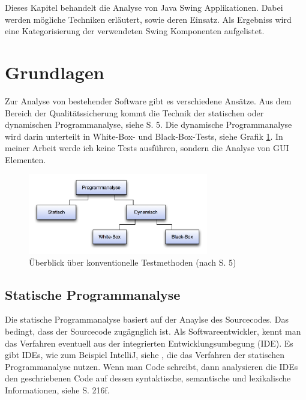   Dieses Kapitel behandelt die Analyse von Java Swing Applikationen. Dabei
  werden mögliche Techniken erläutert, sowie deren Einsatz. Als Ergebniss wird
  eine Kategorisierung der verwendeten Swing Komponenten aufgelistet.
  
  \section{Grundlagen}
  
  Zur Analyse von bestehender Software gibt es verschiedene Ansätze. Aus dem
  Bereich der Qualitätssicherung kommt die Technik der statischen oder
  dynamischen Programmanalyse, siehe \cite{SoftwareanalyseBegriffeUndTechniken}
  S. 5. Die dynamische Programmanalyse wird darin unterteilt in White-Box-
  und Black-Box-Tests, siehe Grafik \ref{img:programmanalyse}. In meiner Arbeit
  werde ich keine Tests ausführen, sondern die Analyse von \ac{GUI} Elementen.
  
  \begin{figure}[ht]
    \begin{center}
      \includegraphics[width=0.7\textwidth]{./image/programmanalyse.png}
      \caption{Überblick über konventionelle Testmethoden (nach
      \cite{SoftwareanalyseBegriffeUndTechniken} S. 5)}
      \label{img:programmanalyse}
    \end{center}
  \end{figure}
  
  \subsection{Statische Programmanalyse}

  Die statische Programmanalyse basiert auf der Anaylse des Sourcecodes. Das
  bedingt, dass der Sourcecode zugägnglich ist. Als Softwareentwickler, kennt
  man das Verfahren eventuell aus der integrierten Entwicklungsumbegung
  (\acs{IDE}). Es gibt \acp{IDE}, wie zum Beispiel IntelliJ, siehe
  \cite{StaticCodeAnalysisIntelliJ}, die das Verfahren der statischen
  Programmanalyse nutzen. Wenn man Code schreibt, dann analysieren die
  \acp{IDE} den geschriebenen Code auf dessen syntaktische, semantische und
  lexikalische Informationen, siehe
  \cite{SoftwareQualitaetsmanagementInDerPraxis} S. 216f.
  
